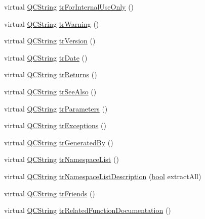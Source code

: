 \begin{DoxyCompactItemize}
virtual \hyperlink{class_q_c_string}{Q\+C\+String} \hyperlink{class_translator_chinesetraditional_a4a4be7e08a61015f2354d202a070f2eb}{tr\+For\+Internal\+Use\+Only} ()
\item 
virtual \hyperlink{class_q_c_string}{Q\+C\+String} \hyperlink{class_translator_chinesetraditional_a5007553b6683b60e83d5f09198943f8f}{tr\+Warning} ()
\item 
virtual \hyperlink{class_q_c_string}{Q\+C\+String} \hyperlink{class_translator_chinesetraditional_a45e0e25d032f75149f367710c81eaf60}{tr\+Version} ()
\item 
virtual \hyperlink{class_q_c_string}{Q\+C\+String} \hyperlink{class_translator_chinesetraditional_ab03266211496908f24b94b4b3143ddb9}{tr\+Date} ()
\item 
virtual \hyperlink{class_q_c_string}{Q\+C\+String} \hyperlink{class_translator_chinesetraditional_ad88945dcceb6d0e446b8ff4e2767133a}{tr\+Returns} ()
\item 
virtual \hyperlink{class_q_c_string}{Q\+C\+String} \hyperlink{class_translator_chinesetraditional_ac0396dc7e8551600fb718e8a555fa392}{tr\+See\+Also} ()
\item 
virtual \hyperlink{class_q_c_string}{Q\+C\+String} \hyperlink{class_translator_chinesetraditional_a0470e477f7a67716fe4c4f7f232ba1d2}{tr\+Parameters} ()
\item 
virtual \hyperlink{class_q_c_string}{Q\+C\+String} \hyperlink{class_translator_chinesetraditional_ad24c0dcf0138acddae4d8ecf43f4717d}{tr\+Exceptions} ()
\item 
virtual \hyperlink{class_q_c_string}{Q\+C\+String} \hyperlink{class_translator_chinesetraditional_aeb5bb752c5fd1b1338aa6da084c65caa}{tr\+Generated\+By} ()
\item 
virtual \hyperlink{class_q_c_string}{Q\+C\+String} \hyperlink{class_translator_chinesetraditional_a6035de5fac1c09cffbad24fbb359791c}{tr\+Namespace\+List} ()
\item 
virtual \hyperlink{class_q_c_string}{Q\+C\+String} \hyperlink{class_translator_chinesetraditional_a5b8b57ddcb0596a4a01b750ee003fdab}{tr\+Namespace\+List\+Description} (\hyperlink{qglobal_8h_a1062901a7428fdd9c7f180f5e01ea056}{bool} extract\+All)
\item 
virtual \hyperlink{class_q_c_string}{Q\+C\+String} \hyperlink{class_translator_chinesetraditional_a3b2466a051e3ce2d5a61c97fd219e6da}{tr\+Friends} ()
\item 
virtual \hyperlink{class_q_c_string}{Q\+C\+String} \hyperlink{class_translator_chinesetraditional_a81f57cd0b4950a7dee0c05399f68a851}{tr\+Related\+Function\+Documentation} ()

\end{DoxyCompactItemize}
